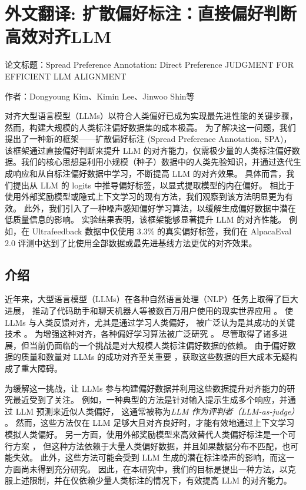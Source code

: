 
\newrefsection

\chapter{外文翻译: 扩散偏好标注：直接偏好判断高效对齐LLM}

论文标题：Spread Preference Annotation: Direct Preference JUDGMENT FOR EFFICIENT LLM ALIGNMENT

作者：Dongyoung Kim、Kimin Lee、Jinwoo Shin等


对齐大型语言模型（LLMs）以符合人类偏好已成为实现最先进性能的关键步骤，然而，构建大规模的人类标注偏好数据集的成本极高。
为了解决这一问题，我们提出了一种新的框架——扩散偏好标注 (Spread Preference Annotation, SPA)，
该框架通过直接偏好判断来提升 LLM 的对齐能力，仅需极少量的人类标注偏好数据。我们的核心思想是利用小规模（种子）数据中的人类先验知识，并通过迭代生成响应和从自标注偏好数据中学习，不断提高 LLM 的对齐效果。
具体而言，我们提出从 LLM 的 logits 中推导偏好标签，以显式提取模型的内在偏好。
相比于使用外部奖励模型或隐式上下文学习的现有方法，我们观察到该方法明显更为有效。
此外，我们引入了一种噪声感知偏好学习算法，以缓解生成偏好数据中潜在低质量信息的影响。
实验结果表明，该框架能够显著提升 LLM 的对齐性能。
例如，在 Ultrafeedback 数据中仅使用 3.3\% 的真实偏好标签，我们在 AlpacaEval 2.0 评测中达到了比使用全部数据或最先进基线方法更优的对齐效果。

\section{介绍}

近年来，大型语言模型（LLMs）在各种自然语言处理（NLP）任务上取得了巨大进展，
推动了代码助手和聊天机器人等被数百万用户使用的现实世界应用 \citep{claude3, openai2022chatgpt, team2023gemini}。  
使 LLMs 与人类反馈对齐，尤其是通过学习人类偏好，
被广泛认为是其成功的关键技术 \citep{christiano2017deep, lee2021pebble, ziegler2019fine}。  
为增强这种对齐，各种偏好学习算法被广泛研究 \citep{ouyang2022training, rafailov2023direct}。  
尽管取得了诸多进展，但当前仍面临的一个挑战是对大规模人类标注偏好数据的依赖。  
由于偏好数据的质量和数量对 LLMs 的成功对齐至关重要 \citep{bai2022training, cui2023ultrafeedback}，获取这些数据的巨大成本无疑构成了重大障碍。  

为缓解这一挑战，让 LLMs 参与构建偏好数据并利用这些数据提升对齐能力的研究最近受到了关注。  
例如，一种典型的方法是针对输入提示生成多个响应，并通过 LLM 预测来近似人类偏好，
这通常被称为\textit{LLM 作为评判者（LLM-as-judge）} \citep{bai2022constitutional, yuan2024self}。  
然而，这些方法仅在 LLM 足够大且对齐良好时，才能有效地通过上下文学习模拟人类偏好。  
另一方面，使用外部奖励模型来高效替代人类偏好标注是一个可行方案 \citep{jiang2023llm, snorkel2024pairrm}，
但这种方法依赖于大量人类偏好数据，并且如果数据分布不匹配，也可能失效。  
此外，这些方法可能会受到 LLM 生成的潜在标注噪声的影响，而这一方面尚未得到充分研究。  
因此，在本研究中，我们的目标是提出一种方法，以克服上述限制，并在仅依赖少量人类标注的情况下，有效提高 LLM 的对齐能力。  

